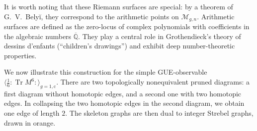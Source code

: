\documentclass[a4paper,11pt,english]{article}
\theoremstyle{plain}
\theoremstyle{definition}
\theoremstyle{plain}
\newcommand{\cc}{\mathrm{c}}
\DeclareMathOperator{\Tr}{Tr}
\newcommand{\normord}[1]{:\mathrel{#1}:}
\newcommand{\NTr}[1]{\normord{\Tr{#1}}}
\newcommand{\M}{\mathcal{M}}
\begin{document}
It is worth noting that these Riemann surfaces are special: by a theorem of G.~V.~Belyĭ, they correspond to the arithmetic points on $\M_{g,n}$. Arithmetic surfaces are defined as the zero-locus of complex polynomials with coefficients in the algebraic numbers $\overline{\mathbb{Q}}$. They play a central role in Grothendieck's theory of dessins d'enfants (``children's drawings'') and exhibit deep number-theoretic properties.

We now illustrate this construction for the simple GUE-observable $\langle \frac{1}{6} \NTr{M^6} \rangle_{g=1,\cc}$. There are two topologically nonequivalent pruned diagrams: a first diagram without homotopic edges, and a second one with two homotopic edges. In collapsing the two homotopic edges in the second diagram, we obtain one edge of length $2$. The skeleton graphs are then dual to integer Strebel graphs, drawn in orange.
\end{document}
